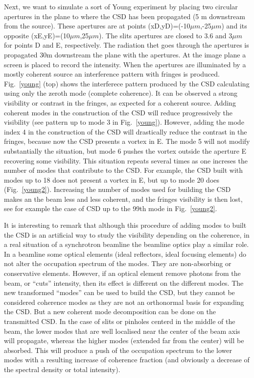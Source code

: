 \documentclass{iucr}              %
\newcommand{\inblue}[1]{{\color{blue}#1}}
\begin{document}
Next, we want to simulate a sort of Young experiment by placing two circular apertures in the plane to where the CSD has been propagated (5 m downstream from the source). These apertures are at points (xD,yD)=(-10$\mu m$,-25$\mu m$) and its opposite (xE,yE)=(10$\mu m$,25$\mu m$). The slits apertures are closed to 3.6 and 3$\mu m$ for points D and E, respectively. The radiation thet goes through the apertures is propagated 30m downstream the plane with the apertures. At the image plane a screen is placed to record the intensity. When the apertures are illuminated by a mostly coherent source an interference pattern with fringes is produced. \inblue{Fig.~\ref{young}} (top) shows the interferece pattern produced by the CSD calculating using only the zeroth mode (complete coherence). It can be observed a strong visibility or contrast in the fringes, as expected for a coherent source. Adding coherent modes in the construction of the CSD will reduce progressively the visibility (see pattern up to mode 3 in \inblue{Fig.~\ref{young}}). However, adding the mode index 4 in the construction of the CSD will drastically reduce the contrast in the fringes, because now the CSD presents a vortex in E. The mode 5 will not modify substantially the situation, but mode 6 pushes the vortex outside the aperture E recovering some visibility. This situation repeats several times as one increses the number of modes that contribute to the CSD. For example, the CSD built with modes up to 18 does not present a vortex in E, but up to mode 20 does (\inblue{Fig.~\ref{young2}}). Increasing the number of modes used for building the CSD makes an the beam less and less coherent, and the fringes visibility is then lost, see for example the case of CSD up to the 99th mode in \inblue{Fig.~\ref{young2}}. 

It is interesting to remark that although this procedure of adding modes to built the CSD is an artificial way to study the visibility depending on the coherence, in a real situation of a synchrotron beamline the beamline optics play a similar role. In a beamline some optical elements (ideal reflectors, ideal focusing elements) do not alter the occupation spectrum of the modes. They are non-absorbing or conservative elements. However, if an optical element remove photons from the beam, or ``cuts'' intensity, then its effect is different on the different modes. The new transformed ``modes'' can be used to build the CSD, but they cannot be considered coherence modes as they are not an orthonormal basis for expanding the CSD. But a new coherent mode decomposition can be done on the transmitted CSD. In the case of slits or pinholes centerd in the middle of the beam, the lower modes that are well localised near the center of the beam axis will propagate, whereas the higher modes (extended far from the center) will be absorbed. This will produce a push of the occupation spectrum to the lower modes with a resulting increase of coherence fraction (and obviously a decrease of the spectral density or total intensity).     
\end{document}
